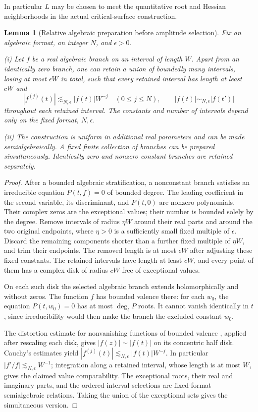 \documentclass[11pt]{amsart}
\newtheorem{lemma}[theorem]{Lemma}
\theoremstyle{definition}
\theoremstyle{remark}
\numberwithin{equation}{section}
\begin{document}
In particular $L$ may be chosen to meet the quantitative root and Hessian neighborhoods in the actual critical-surface construction.
\begin{lemma}[Relative algebraic preparation before amplitude selection]\label{geo:relative-preparation}
Fix an algebraic format, an integer $N$, and $\epsilon>0$.

\noindent\textup{(i)} Let $f$ be a real algebraic branch on an interval of length $W$. Apart from an identically zero branch, one can retain a union of boundedly many intervals, losing at most $\epsilon W$ in total, such that every retained interval has length at least $cW$ and
\[
|f^{(j)}(t)|\lesssim_{N,\epsilon}|f(t)|W^{-j}\quad(0\le j\le N),\qquad |f(t)|\sim_{N,\epsilon}|f(t')|
\]
throughout each retained interval. The constants and number of intervals depend only on the fixed format, $N,\epsilon$.

\noindent\textup{(ii)} The construction is uniform in additional real parameters and can be made semialgebraically. A fixed finite collection of branches can be prepared simultaneously. Identically zero and nonzero constant branches are retained separately.
\end{lemma}
\begin{proof}
After a bounded algebraic stratification, a nonconstant branch satisfies an irreducible equation $P(t,f)=0$ of bounded degree. The leading coefficient in the second variable, its discriminant, and $P(t,0)$ are nonzero polynomials. Their complex zeros are the exceptional values; their number is bounded solely by the degree. Remove intervals of radius $\eta W$ around their real parts and around the two original endpoints, where $\eta>0$ is a sufficiently small fixed multiple of $\epsilon$. Discard the remaining components shorter than a further fixed multiple of $\eta W$, and trim their endpoints. The removed length is at most $\epsilon W$ after adjusting these fixed constants. The retained intervals have length at least $cW$, and every point of them has a complex disk of radius $cW$ free of exceptional values.

On each such disk the selected algebraic branch extends holomorphically and without zeros. The function $f$ has bounded valence there: for each $w_0$, the equation $P(t,w_0)=0$ has at most $\deg_tP$ roots. It cannot vanish identically in $t$, since irreducibility would then make the branch the excluded constant $w_0$.

The distortion estimate for nonvanishing functions of bounded valence \cite[Theorem 3.1]{FriedlandYomdin}, applied after rescaling each disk, gives $|f(z)|\sim|f(t)|$ on its concentric half disk. Cauchy's estimates yield $|f^{(j)}(t)|\lesssim_{N,\epsilon}|f(t)|W^{-j}$. In particular $|f'/f|\lesssim_{N,\epsilon}W^{-1}$; integration along a retained interval, whose length is at most $W$, gives the claimed value comparability. The exceptional roots, their real and imaginary parts, and the ordered interval selections are fixed-format semialgebraic relations. Taking the union of the exceptional sets gives the simultaneous version.
\end{proof}
\end{document}
